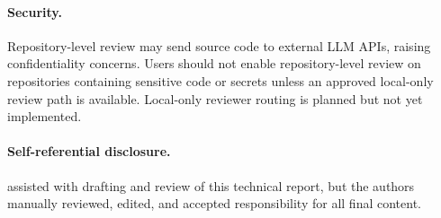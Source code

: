 \paragraph{Security.}
Repository-level review may send source code to external LLM APIs, raising confidentiality concerns.
Users should not enable repository-level review on repositories containing sensitive code or secrets unless an approved local-only review path is available.
Local-only reviewer routing is planned but not yet implemented.

\paragraph{Self-referential disclosure.}
\aris{} assisted with drafting and review of this technical report, but the authors manually reviewed, edited, and accepted responsibility for all final content.

